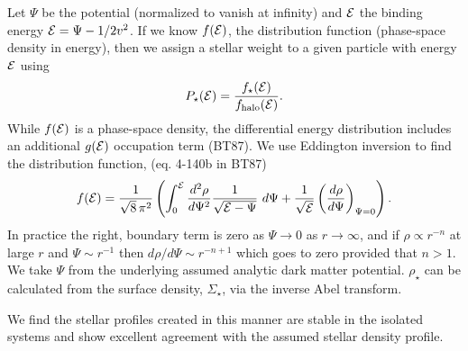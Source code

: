Let \(\Psi\) be the potential (normalized to vanish at infinity) and
\({\cal E}\) the binding energy \({\cal E} = \Psi - 1/2 v^2\). If we
know \(f({\cal E})\), the distribution function (phase-space density in
energy), then we assign a stellar weight to a given particle with energy
\({\cal E}\) using \begin{equation}{
P_\star({\cal E}) = \frac{f_\star({\cal E})}{f_{\rm halo}({\cal E})}.
}\end{equation} While \(f({\cal E})\) is a phase-space density, the
differential energy distribution includes an additional \(g({\cal E})\)
occupation term (BT87). We use Eddington inversion to find the
distribution function, (eq. 4-140b in BT87) \begin{equation}{
f({\cal E}) = \frac{1}{\sqrt{8}\, \pi^2}\left( \int_0^{\cal E} \frac{d^2\rho}{d\Psi^2} \frac{1}{\sqrt{{\cal E} - \Psi}}\ d\Psi + \frac{1}{\sqrt{\cal E}} \left(\frac{d\rho}{d\Psi}\right)_{\Psi=0} \right).
}\end{equation} In practice the right, boundary term is zero as
\(\Psi \to 0\) as \(r\to\infty\), and if \(\rho \propto r^{-n}\) at
large \(r\) and \(\Psi \sim r^{-1}\) then
\(d\rho / d\Psi \sim r^{-n+1}\) which goes to zero provided that
\(n > 1\). We take \(\Psi\) from the underlying assumed analytic dark
matter potential. \(\rho_\star\) can be calculated from the surface
density, \(\Sigma_\star\), via the inverse Abel transform.

We find the stellar profiles created in this manner are stable in the
isolated systems and show excellent agreement with the assumed stellar
density profile.
